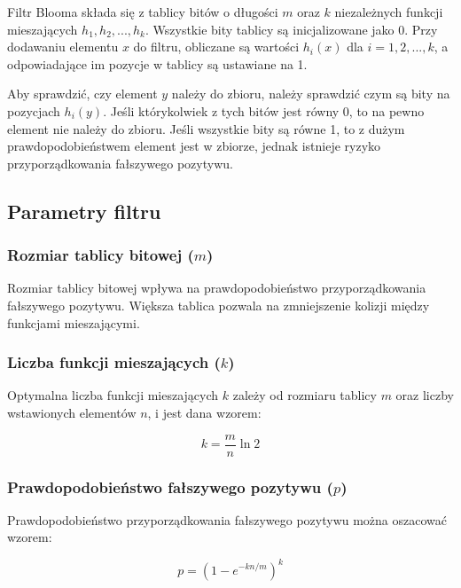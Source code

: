 \documentclass{article}
\begin{document}
Filtr Blooma składa się z tablicy bitów o długości $m$ oraz $k$ niezależnych funkcji mieszających $h_1, h_2, ..., h_k$. Wszystkie bity tablicy są inicjalizowane jako 0. Przy dodawaniu elementu $x$ do filtru, obliczane są wartości $h_i(x)$ dla $i = 1, 2, ..., k$, a odpowiadające im pozycje w tablicy są ustawiane na 1.

Aby sprawdzić, czy element $y$ należy do zbioru, należy sprawdzić czym są bity na pozycjach $h_i(y)$. Jeśli którykolwiek z tych bitów jest równy 0, to na pewno element nie należy do zbioru. Jeśli wszystkie bity są równe 1, to z dużym prawdopodobieństwem element jest w zbiorze, jednak istnieje ryzyko przyporządkowania fałszywego pozytywu.

\subsection{Parametry filtru}

\subsubsection{Rozmiar tablicy bitowej ($m$)}

Rozmiar tablicy bitowej wpływa na prawdopodobieństwo przyporządkowania fałszywego pozytywu. Większa tablica pozwala na zmniejszenie kolizji między funkcjami mieszającymi.

\subsubsection{Liczba funkcji mieszających ($k$)}

Optymalna liczba funkcji mieszających $k$ zależy od rozmiaru tablicy $m$ oraz liczby wstawionych elementów $n$, i jest dana wzorem:

\begin{equation}
k = \frac{m}{n} \ln 2
\end{equation}

\subsubsection{Prawdopodobieństwo fałszywego pozytywu ($p$)}

Prawdopodobieństwo przyporządkowania fałszywego pozytywu można oszacować wzorem:

\begin{equation}
p = \left(1 - e^{-kn/m}\right)^k
\end{equation}
\end{document}

